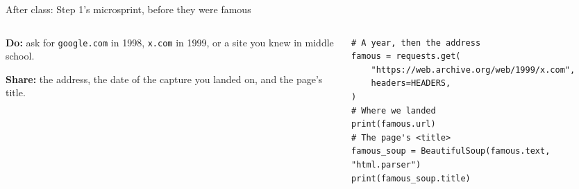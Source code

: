 \documentclass[9pt,aspectratio=169]{beamer}
\begin{document}
\begin{frame}[fragile]{After class: Step 1's microsprint, before they were famous}
    \begin{columns}[T]
        \begin{column}{0.37\textwidth}
            \textbf{Do:} ask for \texttt{google.com} in 1998, \texttt{x.com} in 1999, or a site you knew in middle school.

            \medskip
            \textbf{Share:} the address, the date of the capture you landed on, and the page's title.
        \end{column}
        \begin{column}{0.6\textwidth}
\begin{lstlisting}
# A year, then the address
famous = requests.get(
    "https://web.archive.org/web/1999/x.com",
    headers=HEADERS,
)
# Where we landed
print(famous.url)
# The page's <title>
famous_soup = BeautifulSoup(famous.text, "html.parser")
print(famous_soup.title)
\end{lstlisting}
        \end{column}
    \end{columns}
\end{frame}
\end{document}
